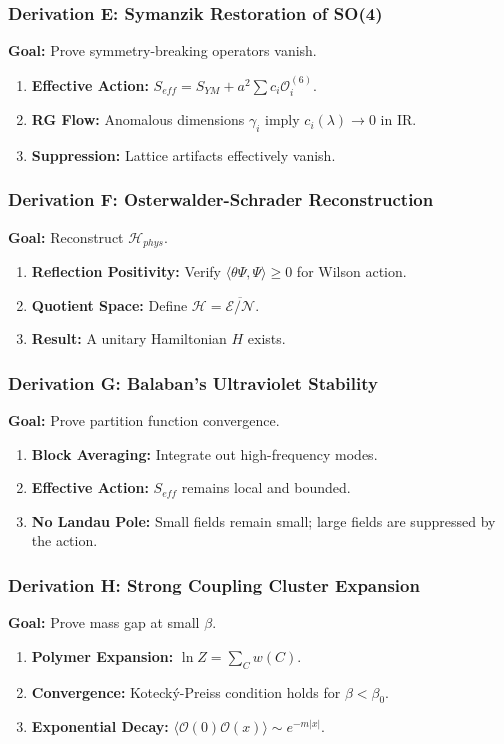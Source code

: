 \subsubsection{Derivation E: Symanzik Restoration of SO(4)}
\textbf{Goal:} Prove symmetry-breaking operators vanish.
\begin{enumerate}
    \item \textbf{Effective Action:} $S_{eff} = S_{YM} + a^2 \sum c_i \mathcal{O}_i^{(6)}$.
    \item \textbf{RG Flow:} Anomalous dimensions $\gamma_i$ imply $c_i(\lambda) \to 0$ in IR.
    \item \textbf{Suppression:} Lattice artifacts effectively vanish.
\end{enumerate}

\subsubsection{Derivation F: Osterwalder-Schrader Reconstruction}
\textbf{Goal:} Reconstruct $\mathcal{H}_{phys}$.
\begin{enumerate}
    \item \textbf{Reflection Positivity:} Verify $\langle \theta \Psi, \Psi \rangle \ge 0$ for Wilson action.
    \item \textbf{Quotient Space:} Define $\mathcal{H} = \overline{\mathcal{E} / \mathcal{N}}$.
    \item \textbf{Result:} A unitary Hamiltonian $H$ exists.
\end{enumerate}

\subsubsection{Derivation G: Balaban's Ultraviolet Stability}
\textbf{Goal:} Prove partition function convergence.
\begin{enumerate}
    \item \textbf{Block Averaging:} Integrate out high-frequency modes.
    \item \textbf{Effective Action:} $S_{eff}$ remains local and bounded.
    \item \textbf{No Landau Pole:} Small fields remain small; large fields are suppressed by the action.
\end{enumerate}

\subsubsection{Derivation H: Strong Coupling Cluster Expansion}
\textbf{Goal:} Prove mass gap at small $\beta$.
\begin{enumerate}
    \item \textbf{Polymer Expansion:} $\ln Z = \sum_{C} w(C)$.
    \item \textbf{Convergence:} Kotecký-Preiss condition holds for $\beta < \beta_0$.
    \item \textbf{Exponential Decay:} $\langle \mathcal{O}(0) \mathcal{O}(x) \rangle \sim e^{-m |x|}$.
\end{enumerate}

